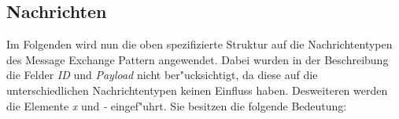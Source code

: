 




\subsection{Nachrichten}
Im Folgenden wird nun die oben spezifizierte Struktur auf die Nachrichtentypen des Message Exchange Pattern angewendet. Dabei wurden in der Beschreibung die Felder \emph{ID} und \emph{Payload} nicht ber"ucksichtigt, da diese auf die unterschiedlichen Nachrichtentypen keinen Einfluss haben. Desweiteren werden die Elemente \emph{x} und \emph{-} eingef"uhrt. Sie besitzen die folgende Bedeutung:


